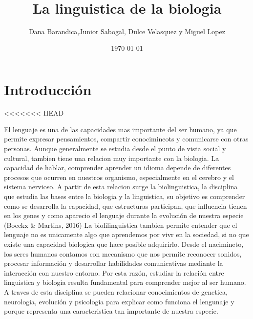 \documentclass[12pt]{article}
\title{La linguistica de la biologia}
\author{Dana Barandica,Junior Sabogal, Dulce Velasquez y Miguel Lopez}
\date{\today}
\begin{document}
\maketitle

\section{Introducción}
<<<<<<< HEAD


El lenguaje es una de las capacidades mas importante del ser humano, ya que permite expresar pensamientos, compartir conocimineots y comunicarse con otras personas. Aunque generalmente se estudia desde el punto de vista social y cultural, tambien tiene una relacion muy importante con la biologia. La capacidad de hablar, comprender aprender un idioma depende de diferentes procesos que ocurren en nuestros organismo, especialmente en el cerebro y el sistema nervioso.
A partir de esta relacion surge la biolinguistica, la disciplina que estudia las bases entre la biologia y la linguistica, su objetivo es comprender como se desarrolla la capacidad, que estructuras participan, que influencia tienen en los genes y como aparecio el lenguaje durante la evolución de nuestra especie (Boeckx & Martins, 2016)
La biolilinguistica tambien permite entender que el lenguaje no es unicamente algo que aprendemos por vivr en la sociedad, si no que existe una capacidad biologica que hace posible adquirirlo. Desde el nacimineto, los seres humanos contamos con mecanismo que nos permite reconocer sonidos, procesar información y desarrollar habilidades comunicativas mediante la interacción con nuestro entorno.
Por esta razón, estudiar la relación entre linguistica y biologia resulta fundamental para comprender mejor al ser humano. A traves de esta disciplina se pueden relacionar conocimientos de genetica, neurologia, evolución y psicologia para explicar como funciona el lengunaje y porque representa una caracteristica tan importante de nuestra especie.
\end{document}
